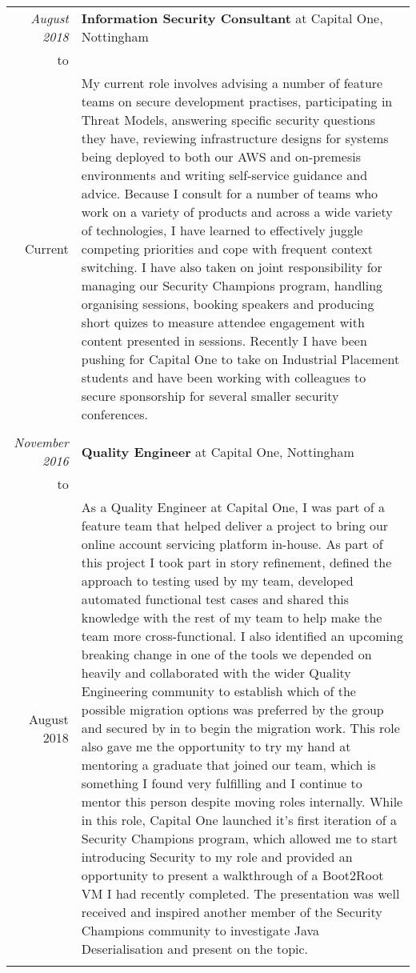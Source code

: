 \documentclass[a4paper,10pt]{article} %
\begin{document}
\begin{longtable}{r|p{16cm}}

\emph{August 2018} & \textbf{Information Security Consultant} at Capital One, Nottingham \\
to & \\
Current & My current role involves advising a number of feature teams on secure development practises, participating in Threat Models, answering specific security questions they have, reviewing infrastructure designs for systems being deployed to both our AWS and on-premesis environments and writing self-service guidance and advice. Because I consult for a number of teams who work on a variety of products and across a wide variety of technologies, I have learned to effectively juggle competing priorities and cope with frequent context switching. I have also taken on joint responsibility for managing our Security Champions program, handling organising sessions, booking speakers and producing short quizes to measure attendee engagement with content presented in sessions. Recently I have been pushing for Capital One to take on Industrial Placement students and have been working with colleagues to secure sponsorship for several smaller security conferences.\\
\multicolumn{2}{c}{} \\

\emph{November 2016} & \textbf{Quality Engineer} at Capital One, Nottingham \\
to & \\
August 2018 & As a Quality Engineer at Capital One, I was part of a feature team that helped deliver a project to bring our online account servicing platform in-house. As part of this project I took part in story refinement, defined the approach to testing used by my team, developed automated functional test cases and shared this knowledge with the rest of my team to help make the team more cross-functional. I also identified an upcoming breaking change in one of the tools we depended on heavily and collaborated with the wider Quality Engineering community to establish which of the possible migration options was preferred by the group and secured by in to begin the migration work. This role also gave me the opportunity to try my hand at mentoring a graduate that joined our team, which is something I found very fulfilling and I continue to mentor this person despite moving roles internally. While in this role, Capital One launched it's first iteration of a Security Champions program, which allowed me to start introducing Security to my role and provided an opportunity to present a walkthrough of a Boot2Root VM I had recently completed. The presentation was well received and inspired another member of the Security Champions community to investigate Java Deserialisation and present on the topic.\\
\multicolumn{2}{c}{} \\


\end{longtable}
\end{document}
